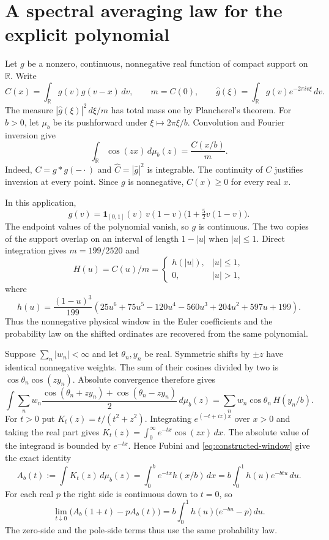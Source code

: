 \section{A spectral averaging law for the explicit polynomial}
\label{sec:concrete-spectral-window}

Let $g$ be a nonzero, continuous, nonnegative real function of compact
support on $\mathbb R$. Write
\[
 C(x)=\int_{\mathbb R}g(v)g(v-x)\,dv,\qquad
 m=C(0),\qquad
 \widehat g(\xi)=\int_{\mathbb R}g(v)e^{-2\pi i v\xi}\,dv .
\]
The measure $|\widehat g(\xi)|^2\,d\xi/m$ has total mass one by
Plancherel's theorem. For $b>0$, let $\mu_b$ be its pushforward under
$\xi\mapsto2\pi\xi/b$. Convolution and Fourier inversion give
\begin{equation}
 \label{eq:constructed-window}
 \int_{\mathbb R}\cos(zx)\,d\mu_b(z)=\frac{C(x/b)}m .
\end{equation}
Indeed, $C=g*g(-\cdot)$ and $\widehat C=|\widehat g|^2$ is integrable.
The continuity of $C$ justifies inversion at every point.
Since $g$ is nonnegative, $C(x)\geq0$ for every real $x$.

In this application,
\[
 g(v)=\mathbf 1_{[0,1]}(v)\,v(1-v)
       \bigl(1+\tfrac52v(1-v)\bigr).
\]
The endpoint values of the polynomial vanish, so $g$ is continuous.
The two copies of the support overlap on an interval of length
$1-|u|$ when $|u|\leq 1$. Direct integration gives
$m=199/2520$ and
\[
 H(u)=C(u)/m=
 \begin{cases}
 h(|u|),&|u|\leq1,\\
 0,&|u|>1,
 \end{cases}
\]
where
\[
 h(u)=\frac{(1-u)^3}{199}
  (25u^6+75u^5-120u^4-560u^3+204u^2+597u+199).
\]
Thus the nonnegative physical window in the Euler coefficients and
the probability law on the shifted ordinates are recovered from the
same polynomial.

Suppose $\sum_n|w_n|<\infty$ and let $\theta_n,y_n$ be real.
Symmetric shifts by $\pm z$ have identical nonnegative weights.
The sum of their cosines divided by two is
$\cos\theta_n\cos(zy_n)$. Absolute convergence therefore gives
\[
 \int \sum_n w_n
 \frac{\cos(\theta_n+zy_n)+\cos(\theta_n-zy_n)}{2}\,d\mu_b(z)
 =
 \sum_n w_n\cos\theta_n\,H(y_n/b).
\]
For $t>0$ put $K_t(z)=t/(t^2+z^2)$. Integrating
$e^{(-t+iz)x}$ over $x>0$ and taking the real part gives
$K_t(z)=\int_0^\infty e^{-tx}\cos(zx)\,dx$.
The absolute value of the integrand is bounded by $e^{-tx}$.
Hence Fubini and \eqref{eq:constructed-window} give the exact identity
\[
 A_b(t):=\int K_t(z)\,d\mu_b(z)
 =\int_0^b e^{-tx}h(x/b)\,dx
 =b\int_0^1 h(u)e^{-btu}\,du.
\]
For each real $p$ the right side is continuous down to $t=0$, so
\begin{equation}
 \lim_{t\downarrow0}\bigl(A_b(1+t)-pA_b(t)\bigr)
   = b\int_0^1 h(u)\bigl(e^{-bu}-p\bigr)\,du.
 \label{eq:computed-limit}
\end{equation}
The zero-side and the pole-side terms thus use the same probability law.

